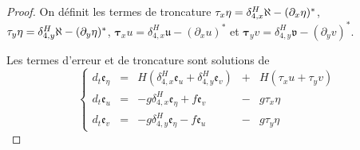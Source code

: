 \begin{proof}
On définit les termes de troncature $\mathbf{\tau}_x \eta = \delta_{4,x}^H \aleph- (\partial_x \eta)^*$, $\mathbf{\tau}_y \eta = \delta_{4,y}^H \aleph- (\partial_y \eta)^*$, $\mathbf{\tau}_x u = \delta_{4,x}^H \mathfrak{u}- (\partial_x u)^*$ et $\mathbf{\tau}_y v = \delta_{4,y}^H \mathfrak{v}- (\partial_y v)^*$.

Les termes d'erreur et de troncature sont solutions de 
\begin{equation}
\left\lbrace
\begin{array}{rcccl}
d_t \mathfrak{e}_{\eta} & = &  H \left( \delta_{4,x}^H \mathfrak{e}_u + \delta_{4,y}^H \mathfrak{e}_v \right) & + & H \left( \tau_x u + \tau_y v \right)\\
d_t \mathfrak{e}_u & = & -g \delta_{4,x}^H \mathfrak{e}_{\eta} + f \mathfrak{e}_v & - & g \tau_x \eta \\
d_t \mathfrak{e}_v & = & - g \delta_{4,y}^H \mathfrak{e}_{\eta} - f \mathfrak{e}_u
 & - & g \tau_y \eta  \end{array}
\right.
\end{equation}


\end{proof}
